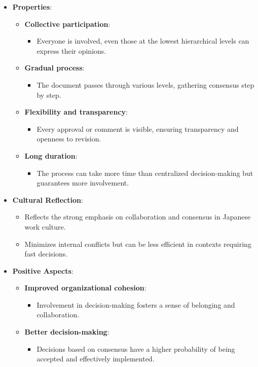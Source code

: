 \documentclass{article}
\begin{document}
\begin{itemize}
    \item \textbf{Properties}:
    \begin{itemize}
        \item \textbf{Collective participation}:
        \begin{itemize}
            \item Everyone is involved, even those at the lowest hierarchical levels can express their opinions.
        \end{itemize}
        \item \textbf{Gradual process}:
        \begin{itemize}
            \item The document passes through various levels, gathering consensus step by step.
        \end{itemize}
        \item \textbf{Flexibility and transparency}:
        \begin{itemize}
            \item Every approval or comment is visible, ensuring transparency and openness to revision.
        \end{itemize}
        \item \textbf{Long duration}:
        \begin{itemize}
            \item The process can take more time than centralized decision-making but guarantees more involvement.
        \end{itemize}
    \end{itemize}

    \item \textbf{Cultural Reflection}:
    \begin{itemize}
        \item Reflects the strong emphasis on collaboration and consensus in Japanese work culture.
        \item Minimizes internal conflicts but can be less efficient in contexts requiring fast decisions.
    \end{itemize}

    \item \textbf{Positive Aspects}:
    \begin{itemize}
        \item \textbf{Improved organizational cohesion}:
        \begin{itemize}
            \item Involvement in decision-making fosters a sense of belonging and collaboration.
        \end{itemize}
        \item \textbf{Better decision-making}:
        \begin{itemize}
            \item Decisions based on consensus have a higher probability of being accepted and effectively implemented.
        \end{itemize}
    \end{itemize}


\end{itemize}
\end{document}

